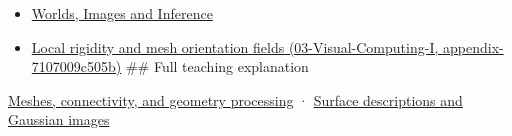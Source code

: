 \begin{itemize}
\item
  \href{Continuous\%20Notes/University\%20-\%20Worlds,\%20Images\%20and\%20Inference\%20-\%20Graphics,\%20Vision\%20and\%20Photography}{Worlds, Images and Inference}
\item
  \href{}{Local rigidity and mesh orientation fields (03-Visual-Computing-I, appendix-7107009c505b)} \#\# Full teaching explanation
\end{itemize}

\href{Continuous\%20Notes/University\%20-\%20Worlds,\%20Images\%20and\%20Inference\%20-\%20Graphics,\%20Vision\%20and\%20Photography\#Meshes,\%20connectivity,\%20and\%20geometry\%20processing}{Meshes, connectivity, and geometry processing} · \href{Continuous\%20Notes/University\%20-\%20Worlds,\%20Images\%20and\%20Inference\%20-\%20Graphics,\%20Vision\%20and\%20Photography\#Surface\%20descriptions\%20and\%20Gaussian\%20images}{Surface descriptions and Gaussian images}

